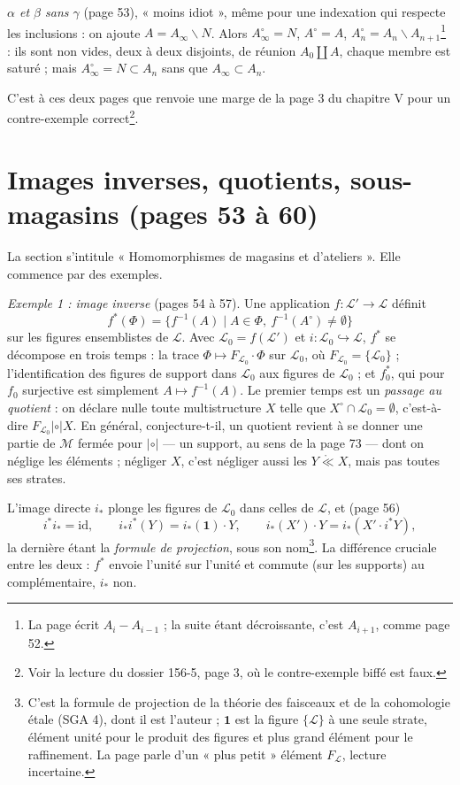 \documentclass[11pt,a4paper]{article}
\begin{document}
\emph{$\alpha$ et $\beta$ sans $\gamma$} (page 53), « moins idiot », même pour
une indexation qui respecte les inclusions : on ajoute $A = A_{\infty}
\smallsetminus N$. Alors $A_{\infty}^{\circ} = N$, $A^{\circ} = A$, $A_{n}^{\circ}
= A_{n} \smallsetminus A_{n+1}$\footnote{La page écrit $A_{i} - A_{i-1}$ ; la
suite étant décroissante, c'est $A_{i+1}$, comme page 52.} : ils sont non vides,
deux à deux disjoints, de réunion $A_{0} \amalg A$, chaque membre est saturé ;
mais $A_{\infty}^{\circ} = N \subset A_{n}$ sans que $A_{\infty} \subset
A_{n}$.

C'est à ces deux pages que renvoie une marge de la page 3 du chapitre V pour un
contre-exemple correct\footnote{Voir la lecture du dossier 156-5, page 3, où le
contre-exemple biffé est faux.}.

\section*{Images inverses, quotients, sous-magasins (pages 53 à 60)}

La section s'intitule « Homomorphismes de magasins et d'ateliers ». Elle
commence par des exemples.

\emph{Exemple 1 : image inverse} (pages 54 à 57). Une application $f :
\mathcal{L}' \to \mathcal{L}$ définit
\[
f^{*}(\Phi) = \{ f^{-1}(A) \mid A \in \Phi,\ f^{-1}(A^{\circ}) \neq \emptyset
\}
\]
sur les figures ensemblistes de $\mathcal{L}$. Avec $\mathcal{L}_{0} =
f(\mathcal{L}')$ et $i : \mathcal{L}_{0} \hookrightarrow \mathcal{L}$, $f^{*}$
se décompose en trois temps : la trace $\Phi \mapsto F_{\mathcal{L}_{0}} \cdot
\Phi$ sur $\mathcal{L}_{0}$, où $F_{\mathcal{L}_{0}} = \{\mathcal{L}_{0}\}$ ;
l'identification des figures de support dans $\mathcal{L}_{0}$ aux figures de
$\mathcal{L}_{0}$ ; et $f_{0}^{*}$, qui pour $f_{0}$ surjective est simplement
$A \mapsto f^{-1}(A)$. Le premier temps est un \emph{passage au quotient} : on
déclare nulle toute multistructure $X$ telle que $X^{\circ} \cap
\mathcal{L}_{0} = \emptyset$, c'est-à-dire $F_{\mathcal{L}_{0}}
\mathrel{|\circ|} X$. En général, conjecture-t-il, un quotient revient à se
donner une partie de $\mathcal{M}$ fermée pour $\mathrel{|\circ|}$ --- un
support, au sens de la page 73 --- dont on néglige les éléments ; négliger $X$,
c'est négliger aussi les $Y \mathrel{\mathring{\ll}} X$, mais pas toutes ses
strates.

L'image directe $i_{*}$ plonge les figures de $\mathcal{L}_{0}$ dans celles de
$\mathcal{L}$, et (page 56)
\[
i^{*} i_{*} = \mathrm{id}, \qquad i_{*} i^{*}(Y) = i_{*}(\mathbf{1}) \cdot Y,
\qquad i_{*}(X') \cdot Y = i_{*}(X' \cdot i^{*}Y),
\]
la dernière étant la \emph{formule de projection}, sous son nom\footnote{C'est
la formule de projection de la théorie des faisceaux et de la cohomologie
étale (SGA 4), dont il est l'auteur ; $\mathbf{1}$ est la figure
$\{\mathcal{L}\}$ à une seule strate, élément unité pour le produit des figures
et plus grand élément pour le raffinement. La page parle d'un « plus petit »
élément $F_{\mathcal{L}}$, lecture incertaine.}. La différence cruciale entre
les deux : $f^{*}$ envoie l'unité sur l'unité et commute (sur les supports) au
complémentaire, $i_{*}$ non.
\end{document}
